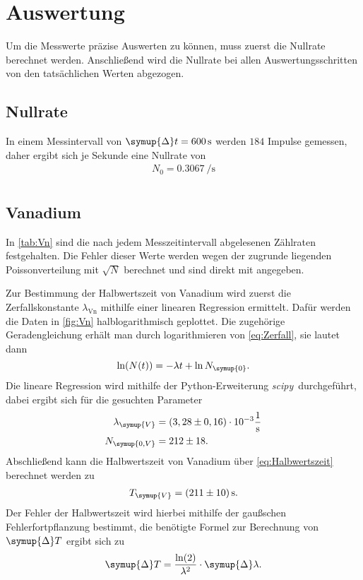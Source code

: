 \section{Auswertung}
\label{sec:Auswertung}

Um die Messwerte präzise Auswerten zu können, muss zuerst die Nullrate berechnet werden.
Anschließend wird die Nullrate bei allen Auswertungsschritten von den tatsächlichen Werten abgezogen.

\subsection{Nullrate}

In einem Messintervall von $\symup{\Delta}t=\qty{600}{\second}$ werden $184$ Impulse gemessen, daher
ergibt sich je Sekunde eine Nullrate von
\begin{gather*}
    N_0=\qty{0.3067}{\per\second} \\
\end{gather*}

\subsection{Vanadium}

In \autoref{tab:Vn} sind die nach jedem Messzeitintervall abgelesenen Zählraten festgehalten.
Die Fehler dieser Werte werden wegen der zugrunde liegenden Poissonverteilung mit $\sqrt{N}$ berechnet und sind
direkt mit angegeben.

Zur Bestimmung der Halbwertszeit von Vanadium wird zuerst die Zerfallskonstante $\lambda_\text{Vn}$ mithilfe einer linearen Regression
ermittelt.
Dafür werden die Daten in \autoref{fig:Vn} halblogarithmisch geplottet.
Die zugehörige Geradengleichung erhält man durch logarithmieren von \eqref{eq:Zerfall}, sie lautet dann
\begin{equation*}
  \ln(N(t)) = -\lambda t + \ln{N_{\symup{0}}}.
\end{equation*}
Die lineare Regression wird mithilfe der Python-Erweiterung \textit{scipy}\,\cite{scipy} durchgeführt, dabei
ergibt sich für die gesuchten Parameter
\begin{align*}
  \lambda_{\symup{V}} &= (3,28 \pm 0,16) \cdot 10^{-3} \unit{\per\second} \\
  N_{\symup{0, V}} &= 212 \pm 18.
\end{align*}
Abschließend kann die Halbwertszeit von Vanadium über \eqref{eq:Halbwertszeit} berechnet werden zu
\begin{gather*}
  T_{\symup{V}} = \qty{211+-10}{\second}.
\end{gather*}
Der Fehler der Halbwertszeit wird hierbei mithilfe der gaußschen Fehlerfortpflanzung bestimmt, die
benötigte Formel zur Berechnung von $\symup{\Delta}T$ ergibt sich zu
\begin{equation}
  \label{delta_t}
  \symup{\Delta}T = \frac{\ln(2)}{\lambda^2} \cdot \symup{\Delta} \lambda. 
\end{equation}


